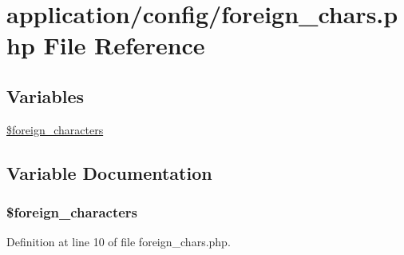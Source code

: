 \hypertarget{foreign__chars_8php}{\section{application/config/foreign\-\_\-chars.php File Reference}
\label{foreign__chars_8php}
}
\subsection*{Variables}
\begin{DoxyCompactItemize}
\item 
\hyperlink{foreign__chars_8php_a77bf091eac4b63b8efea27293e5ca79b}{\$foreign\-\_\-characters}
\end{DoxyCompactItemize}


\subsection{Variable Documentation}
\hypertarget{foreign__chars_8php_a77bf091eac4b63b8efea27293e5ca79b}{
\subsubsection[{\$foreign\-\_\-characters}]{\setlength{\rightskip}{0pt plus 5cm}\$foreign\-\_\-characters}}\label{foreign__chars_8php_a77bf091eac4b63b8efea27293e5ca79b}


Definition at line 10 of file foreign\-\_\-chars.\-php.

